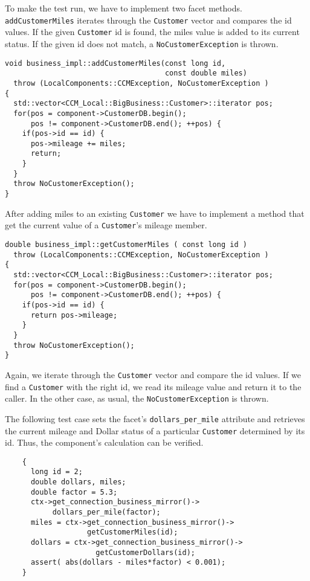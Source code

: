 To make the test run, we have to implement two facet methods.
{\tt addCustomerMiles} iterates through the {\tt Customer} vector
and compares the id values.
If the given {\tt Customer} id is found, the miles value is added to
its current status.
If the given id does not match, a {\tt NoCustomerException} is thrown.
\begin{small}
\begin{verbatim}
void business_impl::addCustomerMiles(const long id, 
                                     const double miles)
  throw (LocalComponents::CCMException, NoCustomerException )
{
  std::vector<CCM_Local::BigBusiness::Customer>::iterator pos;
  for(pos = component->CustomerDB.begin(); 
      pos != component->CustomerDB.end(); ++pos) {
    if(pos->id == id) {
      pos->mileage += miles;
      return;
    }
  }
  throw NoCustomerException();    
}
\end{verbatim}
\end{small}

After adding miles to an existing {\tt Customer} we have to implement a method
that get the current value of a {\tt Customer}'s mileage member.

\begin{small}
\begin{verbatim}
double business_impl::getCustomerMiles ( const long id )
  throw (LocalComponents::CCMException, NoCustomerException )
{
  std::vector<CCM_Local::BigBusiness::Customer>::iterator pos;
  for(pos = component->CustomerDB.begin(); 
      pos != component->CustomerDB.end(); ++pos) {
    if(pos->id == id) {
      return pos->mileage;
    }
  }
  throw NoCustomerException(); 
}
\end{verbatim}
\end{small}

Again, we iterate through the {\tt Customer} vector and compare the id values.
If we find a {\tt Customer} with the right id, we read its mileage value and
return it to the caller.
In the other case, as usual, the {\tt NoCustomerException} is thrown.


The following test case sets the facet's {\tt dollars\_per\_mile} attribute
and retrieves the current mileage and Dollar status of a particular 
{\tt Customer} determined by its id.
Thus, the component's calculation can be verified.

\begin{small}
\begin{verbatim}
    {
      long id = 2;
      double dollars, miles;
      double factor = 5.3;
      ctx->get_connection_business_mirror()->
           dollars_per_mile(factor);
      miles = ctx->get_connection_business_mirror()->
                   getCustomerMiles(id);
      dollars = ctx->get_connection_business_mirror()->
                     getCustomerDollars(id); 
      assert( abs(dollars - miles*factor) < 0.001);
    }
\end{verbatim}
\end{small}

